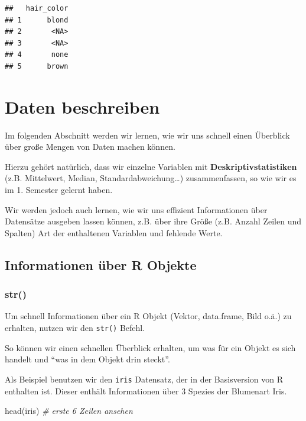 \documentclass[
]{book}
\newenvironment{Shaded}{\begin{snugshade}}{\end{snugshade}}
\newcommand{\CommentTok}[1]{\textcolor[rgb]{0.56,0.35,0.01}{\textit{#1}}}
\newcommand{\FunctionTok}[1]{\textcolor[rgb]{0.00,0.00,0.00}{#1}}
\newcommand{\NormalTok}[1]{#1}
\begin{document}
\begin{verbatim}
##   hair_color
## 1      blond
## 2       <NA>
## 3       <NA>
## 4       none
## 5      brown
\end{verbatim}

\hypertarget{daten-beschreiben}{%
\chapter{Daten beschreiben}\label{daten-beschreiben}}

Im folgenden Abschnitt werden wir lernen, wie wir uns schnell einen Überblick über große Mengen von Daten machen können.

Hierzu gehört natürlich, dass wir einzelne Variablen mit \textbf{Deskriptivstatistiken} (z.B. Mittelwert, Median, Standardabweichung\ldots) zusammenfassen, so wie wir es im 1. Semester gelernt haben.

Wir werden jedoch auch lernen, wie wir uns effizient Informationen über Datensätze ausgeben lassen können, z.B. über ihre Größe (z.B. Anzahl Zeilen und Spalten) Art der enthaltenen Variablen und fehlende Werte.

\hypertarget{informationen-uxfcber-r-objekte}{%
\section{Informationen über R Objekte}\label{informationen-uxfcber-r-objekte}}

\hypertarget{str}{%
\subsection{str()}\label{str}}

Um schnell Informationen über ein R Objekt (Vektor, data.frame, Bild o.ä.) zu erhalten, nutzen wir den \texttt{str()} Befehl.

So können wir einen schnellen Überblick erhalten, um was für ein Objekt es sich handelt und ``was in dem Objekt drin steckt''.

Als Beispiel benutzen wir den \texttt{iris} Datensatz, der in der Basisversion von R enthalten ist. Dieser enthält Informationen über 3 Spezies der Blumenart Iris.

\begin{Shaded}
\begin{Highlighting}[]
\FunctionTok{head}\NormalTok{(iris) }\CommentTok{\# erste 6 Zeilen ansehen}
\end{Highlighting}
\end{Shaded}
\end{document}
